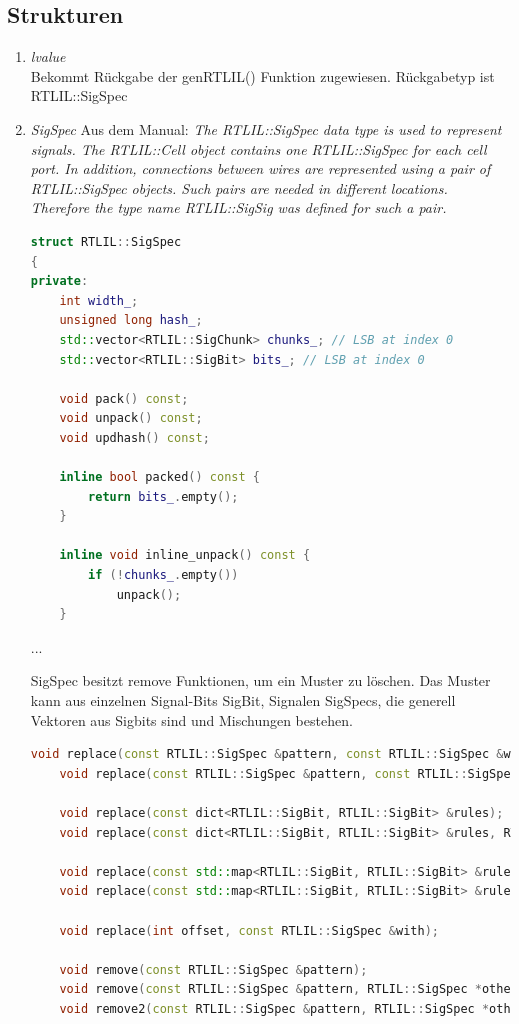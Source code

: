 \documentclass[11pt]{report}
\begin{document}
\subsection{Strukturen}
\begin{enumerate}
  \item \textit{lvalue}
\\
Bekommt Rückgabe der genRTLIL() Funktion zugewiesen. Rückgabetyp ist RTLIL::SigSpec
\item \textit{SigSpec}
Aus dem Manual:
\textit{The RTLIL::SigSpec data type is used to represent signals. The RTLIL::Cell object contains one RTLIL::SigSpec
for each cell port.
In addition, connections between wires are represented using a pair of RTLIL::SigSpec objects. Such pairs are needed in different locations. Therefore the type name RTLIL::SigSig was defined for such a pair.}
\begin{lstlisting}[language=C++]
struct RTLIL::SigSpec
{
private:
	int width_;
	unsigned long hash_;
	std::vector<RTLIL::SigChunk> chunks_; // LSB at index 0
	std::vector<RTLIL::SigBit> bits_; // LSB at index 0

	void pack() const;
	void unpack() const;
	void updhash() const;

	inline bool packed() const {
		return bits_.empty();
	}

	inline void inline_unpack() const {
		if (!chunks_.empty())
			unpack();
	}
\end{lstlisting}
...

SigSpec besitzt remove Funktionen, um ein Muster zu löschen. Das Muster kann aus einzelnen Signal-Bits SigBit, Signalen SigSpecs, die generell Vektoren aus Sigbits sind und Mischungen bestehen.

\begin{lstlisting}[language=C++]
	void replace(const RTLIL::SigSpec &pattern, const RTLIL::SigSpec &with);
	void replace(const RTLIL::SigSpec &pattern, const RTLIL::SigSpec &with, RTLIL::SigSpec *other) const;

	void replace(const dict<RTLIL::SigBit, RTLIL::SigBit> &rules);
	void replace(const dict<RTLIL::SigBit, RTLIL::SigBit> &rules, RTLIL::SigSpec *other) const;

	void replace(const std::map<RTLIL::SigBit, RTLIL::SigBit> &rules);
	void replace(const std::map<RTLIL::SigBit, RTLIL::SigBit> &rules, RTLIL::SigSpec *other) const;

	void replace(int offset, const RTLIL::SigSpec &with);

	void remove(const RTLIL::SigSpec &pattern);
	void remove(const RTLIL::SigSpec &pattern, RTLIL::SigSpec *other) const;
	void remove2(const RTLIL::SigSpec &pattern, RTLIL::SigSpec *other);


\end{lstlisting}
\end{enumerate}
\end{document}
